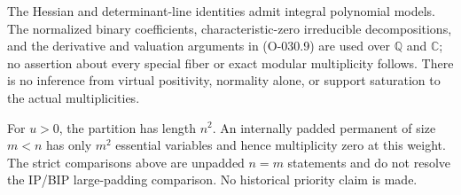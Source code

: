 The Hessian and determinant-line identities admit
integral polynomial models. The normalized binary
coefficients, characteristic-zero irreducible
decompositions, and the derivative and valuation
arguments in (O-030.9) are used over \(\mathbb Q\) and
\(\mathbb C\); no assertion about every special fiber
or exact modular multiplicity follows. There is no
inference from virtual positivity, normality alone,
or support saturation to the actual multiplicities.

For \(u>0\), the partition has length \(n^2\).
An internally padded permanent of size \(m<n\) has
only \(m^2\) essential variables and hence multiplicity
zero at this weight. The strict comparisons above
are unpadded \(n=m\) statements and do not resolve
the IP/BIP large-padding comparison. No historical
priority claim is made.


